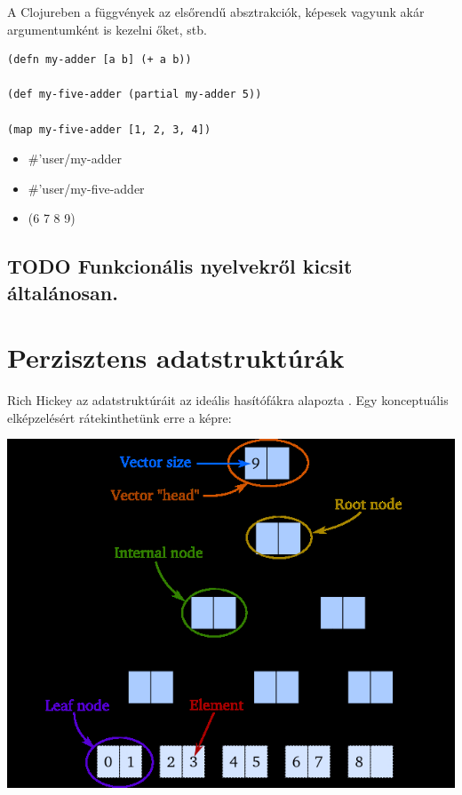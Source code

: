 \documentclass[final, 12pt] {ubb_dolgozat}{book}
\begin{document}
A Clojureben a függvények az elsőrendű absztrakciók, képesek vagyunk akár argumentumként is kezelni őket, stb.

\begin{verbatim}
(defn my-adder [a b] (+ a b))

(def my-five-adder (partial my-adder 5))

(map my-five-adder [1, 2, 3, 4])

\end{verbatim}

\begin{itemize}
\item \#'user/my-adder
\item \#'user/my-five-adder
\item (6 7 8 9)
\end{itemize}

\subsection{{\bfseries\sffamily TODO} Funkcionális nyelvekről kicsit általánosan.}
\label{sec:org975914f}
\section{Perzisztens adatstruktúrák}
\label{sec:org99047e2}
Rich Hickey az adatstruktúráit az ideális hasítófákra alapozta \citep{jayasingheExtremeAmplitudeMassive2019} \citep{bagwellIdealHashTrees2001}. Egy konceptuális elképzelésért
rátekinthetünk erre a képre:

\begin{center}
\includegraphics[width=.9\linewidth]{images/perzisztens-vektor.jpg}
\end{center}
\end{document}
